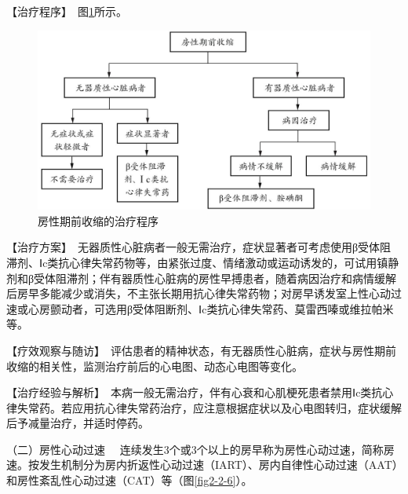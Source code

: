 【治疗程序】　图\ref{fig2-2-5}所示。

\begin{figure}[!htbp]
 \centering
 \includegraphics{./images/Image00050.jpg}
 \captionsetup{justification=centering}
 \caption{房性期前收缩的治疗程序}
 \label{fig2-2-5}
  \end{figure} 

【治疗方案】　无器质性心脏病者一般无需治疗，症状显著者可考虑使用β受体阻滞剂、Ⅰc类抗心律失常药物等，由紧张过度、情绪激动或运动诱发的，可试用镇静剂和β受体阻滞剂；伴有器质性心脏病的房性早搏患者，随着病因治疗和病情缓解后房早多能减少或消失，不主张长期用抗心律失常药物；对房早诱发室上性心动过速或心房颤动者，可选用β受体阻断剂、Ⅰc类抗心律失常药、莫雷西嗪或维拉帕米等。

【疗效观察与随访】　评估患者的精神状态，有无器质性心脏病，症状与房性期前收缩的相关性，监测治疗前后的心电图、动态心电图等变化。

【治疗经验与解析】　本病一般无需治疗，伴有心衰和心肌梗死患者禁用Ⅰc类抗心律失常药。若应用抗心律失常药治疗，应注意根据症状以及心电图转归，症状缓解后予减量治疗，并适时停药。

{（二）房性心动过速}
　连续发生3个或3个以上的房早称为房性心动过速，简称房速。按发生机制分为房内折返性心动过速（IART）、房内自律性心动过速（AAT）和房性紊乱性心动过速（CAT）等（图\ref{fig2-2-6}）。

